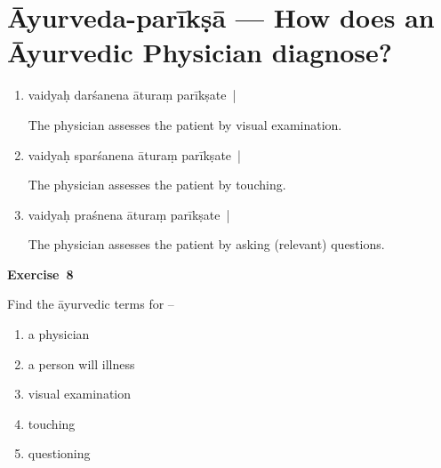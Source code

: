 \chapter{Āyurveda-parīkṣā --- How does an Āyurvedic Physician diagnose?}

\begin{enumerate}
\itemsep=0pt
\item {}

vaidyaḥ darśanena āturaṃ parīkṣate~|

The physician assesses the patient by visual examination. 

\item {}

vaidyaḥ sparśanena āturaṃ parīkṣate~| 

The physician assesses  the patient by touching. 

\item {}

vaidyaḥ praśnena āturaṃ parīkṣate~| 

The physician assesses the patient by asking (relevant) questions.
\end{enumerate}

\centerline{\textbf{Exercise~8}}

Find the āyurvedic terms for –
\begin{enumerate}
\itemsep=0pt
\renewcommand{\theenumi}{\alph{enumi}}
\renewcommand{\labelenumi}{\theenumi.}
\item a physician
\item a person will illness
\item visual examination
\item touching
\item questioning
\end{enumerate}
